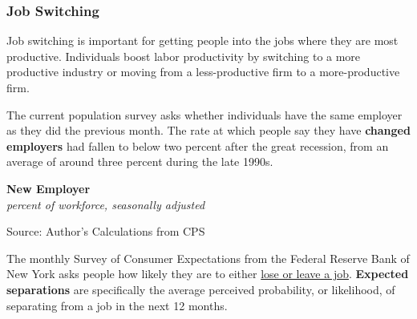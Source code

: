 \documentclass{report}
\makeatletter
\newcommand{\tbllink}[1]{\href{https://raw.githubusercontent.com/bdecon/US-chartbook/master/chartbook/data/#1}{\faTable}}
\newcommand*\short[1]{\expandafter\@gobbletwo\number\numexpr#1\relax}
\newcommand{\dateaxisticks}{
		date coordinates in=x, axis line style={draw=none},
		xmax={2023-11-01},
		max space between ticks=40,	    
		xtick={{1990-01-01}, {1992-01-01}, {1994-01-01}, 
			{1996-01-01}, {1998-01-01}, {2000-01-01}, 
			{2002-01-01}, {2004-01-01}, {2006-01-01},
			{2008-01-01}, {2010-01-01}, {2012-01-01}, {2014-01-01},
		    {2016-01-01}, {2018-01-01}, {2020-01-01}, {2022-01-01}, 
		    {2024-01-01}, {2026-01-01}},
		minor xtick={{1989-01-01}, {1991-01-01}, {1993-01-01},
			{1995-01-01}, {1997-01-01}, {1999-01-01}, 
			{2001-01-01}, {2003-01-01}, {2005-01-01}, {2007-01-01},
		    {2009-01-01}, {2011-01-01}, {2013-01-01}, {2015-01-01},
		    {2017-01-01}, {2019-01-01}, {2021-01-01}, {2023-01-01}, 
		    {2025-01-01}, {2027-01-01}},
		enlarge y limits={0.06}, enlarge x limits={0.01},
		}
\newcommand{\stdline}[4]{\addplot[very thick, no markers, color=#1] 
		table [x=#2, y=#3, col sep=comma] {#4};	}
\newcommand{\thickline}[4]{\addplot[ultra thick, no markers, color=#1] 
		table [x=#2, y=#3, col sep=comma] {#4};	}
\newcommand{\rebars}{
		\fill[color=black!10] (axis cs:{2007-12-01},\pgfkeysvalueof{/pgfplots/ymin}) rectangle 
			(axis cs:{2009-07-01}, \pgfkeysvalueof{/pgfplots/ymax});
		\fill[color=black!10] (axis cs:{2001-03-01},\pgfkeysvalueof{/pgfplots/ymin}) rectangle 
			(axis cs:{2001-11-01}, \pgfkeysvalueof{/pgfplots/ymax});
		\fill[color=black!10] (axis cs:{2020-02-01},\pgfkeysvalueof{/pgfplots/ymin}) rectangle 
			(axis cs:{2020-05-01}, \pgfkeysvalueof{/pgfplots/ymax});}
\makeatother
\begin{document}
{\begin{minipage}{0.76\textwidth}
\subsubsection*{Job Switching}
\small Job switching is important for getting people into the jobs where they are most productive. Individuals boost labor productivity by switching to a more productive industry or moving from a less-productive firm to a more-productive firm. 

The current population survey asks whether individuals have the same employer as they did the previous month. The rate at which people say they have \textbf{changed employers} had fallen to below two percent after the great recession, from an average of around three percent during the late 1990s. 

 
\vspace{0.5mm}

\normalsize \textbf{New Employer}\\
\footnotesize{\textit{percent of workforce, seasonally adjusted}}
\vspace{3.7cm}

\hspace{2mm} 

\footnotesize{Source: Author's Calculations from CPS} \hfill \tbllink{jobswitch.csv} 
\vspace{5mm}

\small The monthly Survey of Consumer Expectations from the Federal Reserve Bank of New York asks people how likely they are to either \href{https://www.newyorkfed.org/microeconomics/sce#/jobsep-1}{lose or leave a job}. \textbf{Expected separations} are specifically the average perceived probability, or likelihood, of separating from a job in the next 12 months. 
\end{minipage}
\vspace{0.5mm}

}
\end{document}
